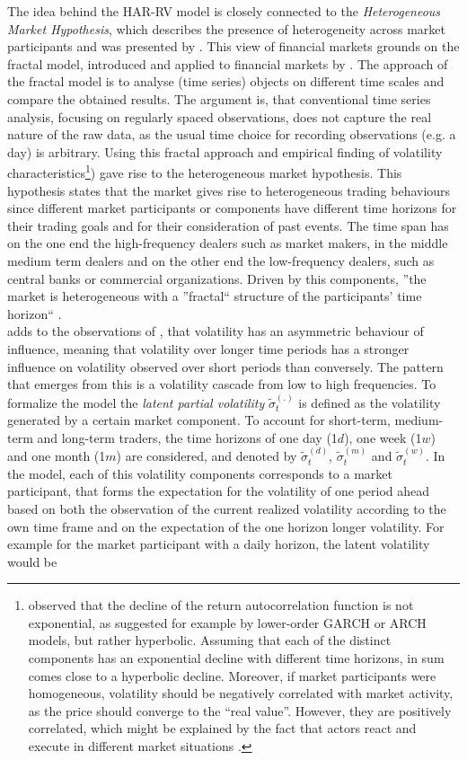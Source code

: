 The idea behind the HAR-RV model is closely connected to the \emph{Heterogeneous Market Hypothesis}, which describes the presence of heterogeneity across market participants and was presented by \textcite{mueller1993}. This view of financial markets grounds on the fractal model, introduced and applied to financial markets by \textcite{mandelbrot1963}. The approach of the fractal model is to analyse (time series) objects on different time scales and compare the obtained results. The argument is, that conventional time series analysis, focusing on regularly spaced observations, does not capture the real nature of the raw data, as the usual time choice for recording observations (e.g. a day) is arbitrary. Using this fractal approach and empirical finding of volatility characteristics\footnote{\textcite{mueller1993} observed that the decline of the return autocorrelation function is not exponential, as suggested for example by lower-order GARCH or ARCH models, but rather hyperbolic. Assuming that each of the distinct components has an exponential decline with different time horizons, in sum comes close to a hyperbolic decline. Moreover, if market participants were homogeneous, volatility should be negatively correlated with market activity, as the price should converge to the ``real value''. However, they are positively correlated, which might be explained by the fact that actors react and execute in different market situations \parencite{mueller1993}.}) gave rise to the heterogeneous market hypothesis. This hypothesis states that the market gives rise to heterogeneous trading behaviours since different market participants or components have different time horizons for their trading goals and for their consideration of past events. The time span has on the one end the high-frequency dealers such as market makers, in the middle medium term dealers and on the other end the low-frequency dealers, such as central banks or commercial organizations. Driven by this components, ''the market is heterogeneous with a ''fractal`` structure of the participants' time horizon`` \parencite[p.12]{mueller1993}.\\
\textcite{corsi2009} adds to the observations of \textcite{mueller1993}, that volatility has an asymmetric behaviour of influence, meaning that volatility over longer time periods has a stronger influence on volatility observed over short periods than conversely. The pattern that emerges from this is a volatility cascade from low to high frequencies. To formalize the model the \emph{latent partial volatility} $\tilde{\sigma}_{t}^{(.)}$ is defined as the volatility generated by a certain market component. To account for short-term, medium-term and long-term traders, the time horizons of one day (1$d$), one week (1$w$) and one month (1$m$) are considered, and denoted by $\tilde{\sigma}_{t}^{(d)}$, $\tilde{\sigma}_{t}^{(m)}$ and $\tilde{\sigma}_{t}^{(w)}$. In the model, each of this volatility components corresponds to a market participant, that forms the expectation for the volatility of one period ahead based on both the observation of the current realized volatility according to the own time frame and on the expectation of the one horizon longer volatility. For example for the market participant with a daily horizon, the latent volatility would be
